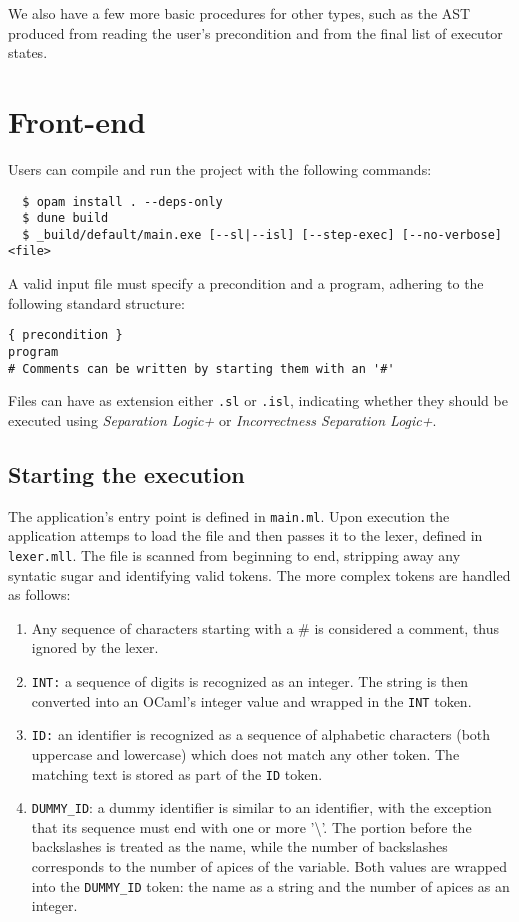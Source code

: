 \documentclass[parskip=half]{scrartcl}
\begin{document}
We also have a few more basic procedures for other types, such as the AST produced from reading the user's precondition and from the final list of executor states.

\section{Front-end}
Users can compile and run the project with the following commands:
\begin{verbatim}
  $ opam install . --deps-only
  $ dune build
  $ _build/default/main.exe [--sl|--isl] [--step-exec] [--no-verbose] <file>
\end{verbatim}

A valid input file must specify a precondition and a program, adhering to the following standard structure:

\begin{verbatim}
{ precondition }
program
# Comments can be written by starting them with an '#'
\end{verbatim}

Files can have as extension either \texttt{.sl} or \texttt{.isl}, 
indicating whether they should be executed using 
\textit{Separation Logic+} or \textit{Incorrectness Separation Logic+}.

\subsection{Starting the execution}
The application's entry point is defined in \texttt{main.ml}.
Upon execution the application attemps to load the file and then passes it to the lexer, defined in \texttt{lexer.mll}. 
The file is scanned from beginning to end, stripping away any syntatic sugar and identifying valid tokens.
The more complex tokens are handled as follows:

\begin{enumerate}
  \item Any sequence of characters starting with a \# is considered a comment, thus ignored by the lexer.
  
  \item \texttt{INT:} a sequence of digits is recognized as an integer. 
  The string is then converted into an OCaml's integer value and wrapped in the \texttt{INT} token.
      

  \item \texttt{ID:} an identifier is recognized as a sequence of alphabetic characters (both uppercase and lowercase) which does not match any other token. 
        The matching text is stored as part of the \texttt{ID} token.
  
  \item \texttt{DUMMY\_ID}: a dummy identifier is similar to an identifier, with the exception that
        its sequence must end with one or more '\textbackslash{}'.
        The portion before the backslashes is treated as the name, while the number of backslashes corresponds to the number of apices of the variable.
        Both values are wrapped into the \texttt{DUMMY\_ID} token: the name as a string and the number of apices as an integer.
\end{enumerate}
\end{document}

